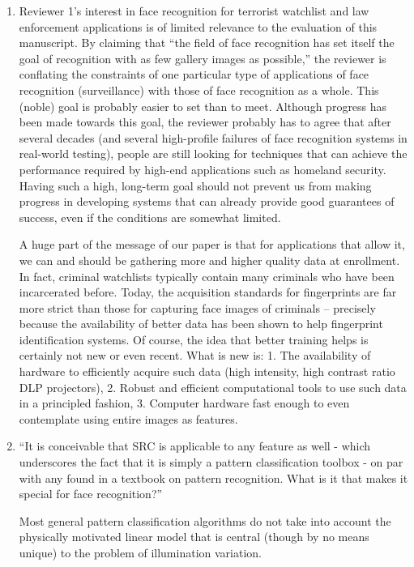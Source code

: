 \documentclass[11pt]{article}
\begin{document}
\begin{enumerate}
\item Reviewer 1's interest in face recognition for terrorist watchlist and law
enforcement applications is of limited relevance to the evaluation of this
manuscript.  By claiming that ``the field of face recognition has set itself the
goal of recognition with as few gallery images as possible,'' the reviewer is
conflating the constraints of one particular type of applications of face recognition
(surveillance) with those of face recognition as a whole. This (noble) goal is probably easier to
set than to meet. Although progress has been made towards this goal, the reviewer
probably has to agree that after several decades (and several high-profile failures of
face recognition systems in real-world testing), people are still looking for techniques
that can achieve the performance required by high-end applications such as homeland
security. Having such a high, long-term goal should not prevent us from making progress in developing systems that
can already provide good guarantees of success, even if the conditions are somewhat limited.

A huge part of the message of our paper is that for applications that allow it, we can and should
be gathering more and higher quality data at enrollment. In fact, criminal watchlists typically contain many criminals who have been incarcerated before. Today,
the acquisition standards for fingerprints are far more strict than those for
capturing face images of criminals -- precisely because the availability of better data has been shown to
help fingerprint identification systems. Of course, the idea that better training helps is certainly
not new or even recent.  What is new is: 1. The availability
of hardware to efficiently acquire such data (high intensity, high contrast
ratio DLP projectors), 2. Robust and efficient computational tools to use such data in a
principled fashion, 3. Computer hardware fast enough to even contemplate using
entire images as features.

\item ``It is conceivable that SRC is applicable to any feature as well - which
underscores the fact that it is simply a pattern classification toolbox - on
par with any found in a textbook on pattern recognition. What is it that makes
it special for face recognition?''

Most general pattern classification algorithms do not take into account the
physically motivated linear model that is central (though by no means unique)
to the problem of illumination variation.


\end{enumerate}
\end{document}

